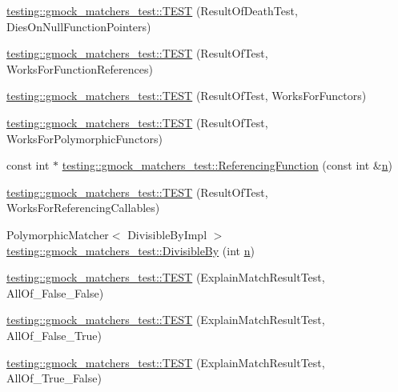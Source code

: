\begin{DoxyCompactItemize}
\item 
\hyperlink{namespacetesting_1_1gmock__matchers__test_a4c929e5b46a503a9bb48c8b88dcbbf2a}{testing\+::gmock\+\_\+matchers\+\_\+test\+::\+T\+E\+ST} (Result\+Of\+Death\+Test, Dies\+On\+Null\+Function\+Pointers)
\item 
\hyperlink{namespacetesting_1_1gmock__matchers__test_a1638ee6460100cbe21c65b6cdc06579a}{testing\+::gmock\+\_\+matchers\+\_\+test\+::\+T\+E\+ST} (Result\+Of\+Test, Works\+For\+Function\+References)
\item 
\hyperlink{namespacetesting_1_1gmock__matchers__test_a19b7a39915f7ad5a0b741caf7ae4e619}{testing\+::gmock\+\_\+matchers\+\_\+test\+::\+T\+E\+ST} (Result\+Of\+Test, Works\+For\+Functors)
\item 
\hyperlink{namespacetesting_1_1gmock__matchers__test_a976290e53e319b06c51a94f7e450d765}{testing\+::gmock\+\_\+matchers\+\_\+test\+::\+T\+E\+ST} (Result\+Of\+Test, Works\+For\+Polymorphic\+Functors)
\item 
const int $\ast$ \hyperlink{namespacetesting_1_1gmock__matchers__test_af3164fc302e0b727c1eb745bdeb959f6}{testing\+::gmock\+\_\+matchers\+\_\+test\+::\+Referencing\+Function} (const int \&\hyperlink{app_2main_8cpp_acfc02ec89670db29251fda6a66602ce2}{n})
\item 
\hyperlink{namespacetesting_1_1gmock__matchers__test_a00ee08657c9e9e0c306be7b84cd2848c}{testing\+::gmock\+\_\+matchers\+\_\+test\+::\+T\+E\+ST} (Result\+Of\+Test, Works\+For\+Referencing\+Callables)
\item 
Polymorphic\+Matcher$<$ Divisible\+By\+Impl $>$ \hyperlink{namespacetesting_1_1gmock__matchers__test_ac5b1fd3b6a8141c7e83ef6040ed4630f}{testing\+::gmock\+\_\+matchers\+\_\+test\+::\+Divisible\+By} (int \hyperlink{app_2main_8cpp_acfc02ec89670db29251fda6a66602ce2}{n})
\item 
\hyperlink{namespacetesting_1_1gmock__matchers__test_aa9a60a406d9f495de8c8552abf577dd1}{testing\+::gmock\+\_\+matchers\+\_\+test\+::\+T\+E\+ST} (Explain\+Match\+Result\+Test, All\+Of\+\_\+\+False\+\_\+\+False)
\item 
\hyperlink{namespacetesting_1_1gmock__matchers__test_a099aebb5417d5bd85e11aefe935ec345}{testing\+::gmock\+\_\+matchers\+\_\+test\+::\+T\+E\+ST} (Explain\+Match\+Result\+Test, All\+Of\+\_\+\+False\+\_\+\+True)
\item 
\hyperlink{namespacetesting_1_1gmock__matchers__test_a5d386691eaed59994a1d2b65f94b23a9}{testing\+::gmock\+\_\+matchers\+\_\+test\+::\+T\+E\+ST} (Explain\+Match\+Result\+Test, All\+Of\+\_\+\+True\+\_\+\+False)

\end{DoxyCompactItemize}
